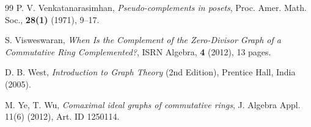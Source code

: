 \documentclass[10pt,one side,emlines]{amsart}
\theoremstyle{definition}
\begin{document}
\begin{thebibliography}{99}
	 P. V. Venkatanarasimhan, {\it Pseudo-complements in posets}, Proc. Amer. Math. Soc., {\bf 28(1)} (1971), 9–17.
	
	 S. Visweswaran, {\it When Is the Complement of the Zero-Divisor Graph of a Commutative Ring Complemented?}, ISRN Algebra, {\bf 4} (2012), 13 pages.
	
	 D. B. West, {\it Introduction to Graph Theory} (2nd Edition), Prentice Hall, India (2005).

    M. Ye, T. Wu, {\it 	Comaximal ideal graphs of commutative rings}, J. Algebra Appl. 11(6) (2012), Art. ID
   1250114.

	

	
\end{thebibliography}
\end{document}
